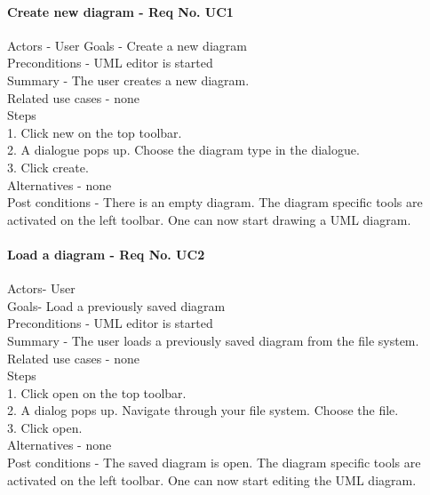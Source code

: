\documentclass[twoside,letterpaper]{article}
\begin{document}
{\paragraph{Create new diagram - Req No. UC1\newline}
 Actors - User
Goals - Create a new diagram\\
Preconditions - UML editor is started\\
Summary - The user creates a new diagram.\\
Related use cases - none\\
Steps\\
1. Click new on the top toolbar. \\
2. A dialogue pops up. Choose the diagram type in the dialogue.\\
3. Click create.\\
Alternatives - none \\
Post conditions - There is an empty diagram.  The diagram specific tools are activated on the left toolbar. One can now start drawing a UML diagram.

\paragraph{Load a diagram - Req No. UC2\newline}
Actors- User\\
Goals- Load a previously saved diagram\\
Preconditions - UML editor is started\\
Summary - The user loads a previously saved diagram from the file system.\\
Related use cases - none\\
Steps\\
1. Click open on the top toolbar.\\
2. A dialog pops up. Navigate through your file system. Choose the file.\\
3. Click open.\\
Alternatives - none\\
Post conditions - The saved diagram is open.  The diagram specific tools are activated on the left toolbar. One can now start editing the UML diagram.\\

}
\end{document}
